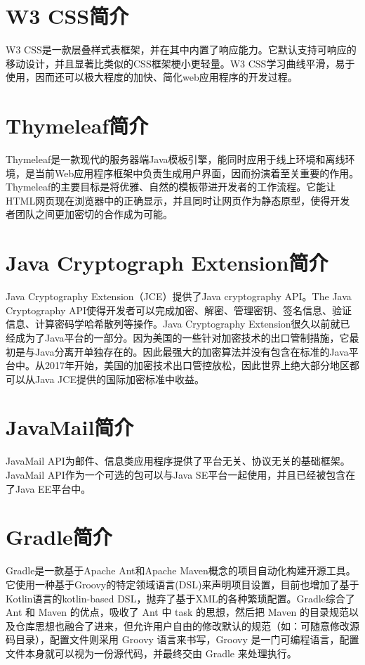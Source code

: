 \section{W3 CSS简介}

W3 CSS是一款层叠样式表框架，并在其中内置了响应能力。它默认支持可响应的移动设计，并且显著比类似的CSS框架梗小更轻量。W3 CSS学习曲线平滑，易于使用，因而还可以极大程度的加快、简化web应用程序的开发过程。

\section{Thymeleaf简介}

Thymeleaf是一款现代的服务器端Java模板引擎，能同时应用于线上环境和离线环境，是当前Web应用程序框架中负责生成用户界面，因而扮演着至关重要的作用。Thymeleaf的主要目标是将优雅、自然的模板带进开发者的工作流程。它能让HTML网页现在浏览器中的正确显示，并且同时让网页作为静态原型，使得开发者团队之间更加密切的合作成为可能。

\section{Java Cryptograph Extension简介}

Java Cryptography Extension（JCE）提供了Java cryptography API。The Java Cryptography API使得开发者可以完成加密、解密、管理密钥、签名信息、验证信息、计算密码学哈希散列等操作。Java Cryptography Extension很久以前就已经成为了Java平台的一部分。因为美国的一些针对加密技术的出口管制措施，它最初是与Java分离开单独存在的。因此最强大的加密算法并没有包含在标准的Java平台中。从2017年开始，美国的加密技术出口管控放松，因此世界上绝大部分地区都可以从Java JCE提供的国际加密标准中收益。

\section{JavaMail简介}

JavaMail API为邮件、信息类应用程序提供了平台无关、协议无关的基础框架。JavaMail API作为一个可选的包可以与Java SE平台一起使用，并且已经被包含在了Java EE平台中。

\section{Gradle简介}

Gradle是一款基于Apache Ant和Apache Maven概念的项目自动化构建开源工具。它使用一种基于Groovy的特定领域语言(DSL)来声明项目设置，目前也增加了基于Kotlin语言的kotlin-based DSL，抛弃了基于XML的各种繁琐配置。Gradle综合了 Ant 和 Maven 的优点，吸收了 Ant 中 task 的思想，然后把 Maven 的目录规范以及仓库思想也融合了进来，但允许用户自由的修改默认的规范（如：可随意修改源码目录），配置文件则采用 Groovy 语言来书写，Groovy 是一门可编程语言，配置文件本身就可以视为一份源代码，并最终交由 Gradle 来处理执行。

